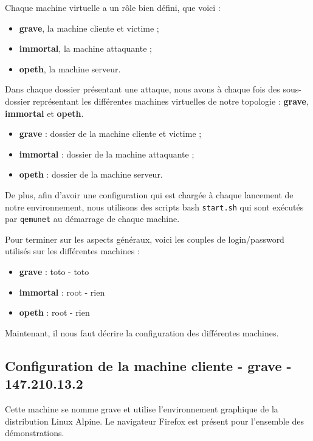 \inputminted[bgcolor=lbcolor, breaklines]{shell}{../sslstrip2/topology}

Chaque machine virtuelle a un rôle bien défini, que voici :

\begin{itemize}
\item \textbf{grave}, la machine cliente et victime ;
\item \textbf{immortal}, la machine attaquante ;
\item \textbf{opeth}, la machine serveur.
\end{itemize}

Dans chaque dossier présentant une attaque, nous avons à chaque fois des sous-dossier représentant les différentes machines virtuelles de notre topologie : \textbf{grave}, \textbf{immortal} et \textbf{opeth}.

\begin{itemize}
\item \textbf{grave} : dossier de la machine cliente et victime ;
\item \textbf{immortal} : dossier de la machine attaquante ;
\item \textbf{opeth} : dossier de la machine serveur.
\end{itemize}

De plus, afin d'avoir une configuration qui est chargée à chaque lancement de notre environnement, nous utilisons des scripts bash \verb+start.sh+ qui sont exécutés par \verb+qemunet+ au démarrage de chaque machine.

Pour terminer sur les aspects généraux, voici les couples de login/password utilisés sur les différentes machines :

\begin{itemize}
\item \textbf{grave} : toto - toto
\item \textbf{immortal} : root - rien
\item \textbf{opeth} : root - rien
\end{itemize}

Maintenant, il nous faut décrire la configuration des différentes machines.

\subsection{Configuration de la machine cliente - grave - 147.210.13.2}

Cette machine se nomme grave et utilise l'environnement graphique de la distribution Linux Alpine. Le navigateur Firefox est présent pour l'ensemble des démonstrations.


